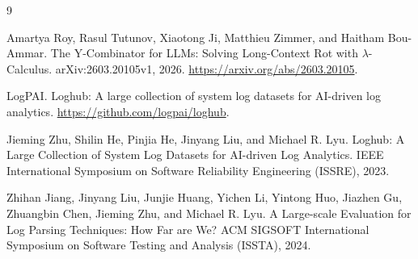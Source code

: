 \documentclass[11pt]{article}
\begin{document}
\begin{thebibliography}{9}

Amartya Roy, Rasul Tutunov, Xiaotong Ji, Matthieu Zimmer, and Haitham
Bou-Ammar.
\newblock The Y-Combinator for LLMs: Solving Long-Context Rot with
$\lambda$-Calculus.
\newblock arXiv:2603.20105v1, 2026.
\newblock \url{https://arxiv.org/abs/2603.20105}.

LogPAI.
\newblock Loghub: A large collection of system log datasets for AI-driven log
analytics.
\newblock \url{https://github.com/logpai/loghub}.

Jieming Zhu, Shilin He, Pinjia He, Jinyang Liu, and Michael R. Lyu.
\newblock Loghub: A Large Collection of System Log Datasets for AI-driven Log
Analytics.
\newblock IEEE International Symposium on Software Reliability Engineering
(ISSRE), 2023.

Zhihan Jiang, Jinyang Liu, Junjie Huang, Yichen Li, Yintong Huo, Jiazhen Gu,
Zhuangbin Chen, Jieming Zhu, and Michael R. Lyu.
\newblock A Large-scale Evaluation for Log Parsing Techniques: How Far are We?
\newblock ACM SIGSOFT International Symposium on Software Testing and Analysis
(ISSTA), 2024.

\end{thebibliography}
\end{document}
